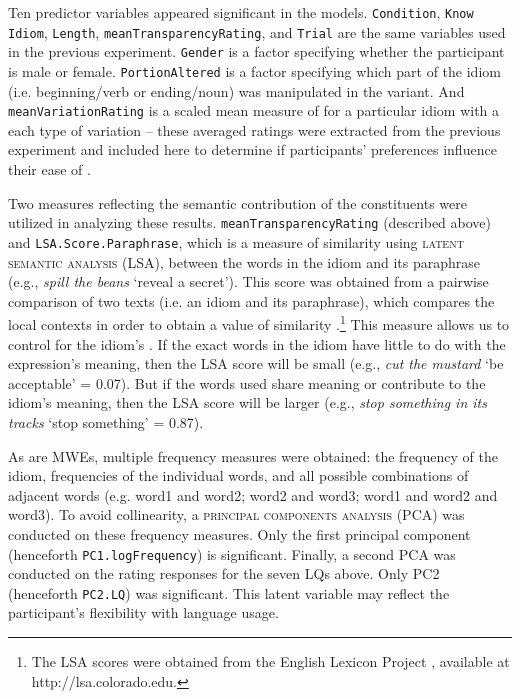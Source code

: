\documentclass[output=paper
,modfonts
,nonflat]{langsci/langscibook}
\begin{document}
Ten predictor variables appeared significant in the models. \texttt{Condition}, \texttt{Know Idiom}, \texttt{Length}, \texttt{meanTransparencyRating}, and \texttt{Trial} are the same variables used in the previous experiment. \texttt{Gender} is a factor specifying whether the participant is male or female. \texttt{PortionAltered} is a factor specifying which part of the idiom (i.e. beginning/verb or ending/noun) was manipulated in the variant. And \texttt{meanVariationRating} is a scaled mean measure of  for a particular idiom with a each type of variation  -- these averaged ratings were extracted from the previous experiment and included here to determine if participants' preferences influence their ease of .

Two measures reflecting the semantic contribution of the constituents were utilized in analyzing these results. \texttt{meanTransparencyRating} (described above) and \texttt{LSA.Score.Paraphrase}, which is a measure of similarity using \textsc{latent semantic analysis} (LSA), between the words in the idiom and its paraphrase (e.g., \textit{spill the beans} `reveal a secret'). This score was obtained from a pairwise comparison of two texts (i.e. an idiom and its paraphrase), which compares the local contexts in order to obtain a value of similarity \citep{LandauerEtAl1998}.\footnote{The LSA scores were obtained from the English Lexicon Project \citep{BalotaEtAl2007}, available at http://lsa.colorado.edu.} This measure allows us to control for the idiom's . If the exact words in the idiom have little to do with the expression's meaning, then the LSA score will be small (e.g., \textit{cut the mustard} `be acceptable' = 0.07). But if the words used share meaning or contribute to the idiom's meaning, then the LSA score will be larger (e.g., \textit{stop something in its tracks} `stop something' = 0.87).
   
As  are MWEs,  multiple frequency measures were obtained: the frequency of the idiom, frequencies of the individual words, and all possible combinations of adjacent words (e.g. word1 and word2; word2 and word3; word1 and word2 and word3). To avoid collinearity, a \textsc{principal components analysis} (PCA) was conducted on these frequency measures. Only the first principal component (henceforth \texttt{PC1.logFrequency}) is significant. Finally, a second PCA was conducted on the rating responses for the seven LQs above. Only PC2 (henceforth \texttt{PC2.LQ}) was significant. This latent variable may reflect the participant's flexibility with language usage.
\end{document}
